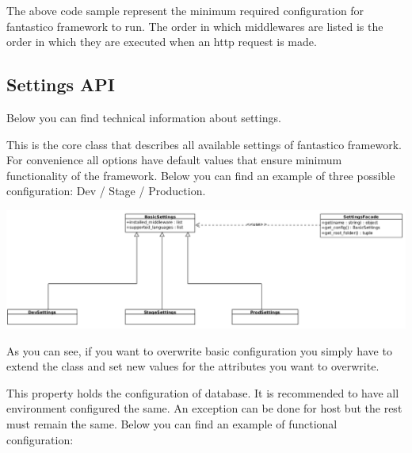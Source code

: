 \documentclass[letterpaper,10pt,english]{sphinxmanual}
\begin{document}
The above code sample represent the minimum required configuration for fantastico framework to run. The order in which middlewares
are listed is the order in which they are executed when an http request is made.


\subsection{Settings API}
\label{get_started/settings:settings-api}
Below you can find technical information about settings.

\begin{fulllineitems}
\label{get_started/settings:fantastico.settings.BasicSettings}
This is the core class that describes all available settings of fantastico framework. For convenience all options
have default values that ensure minimum functionality of the framework. Below you can find an example of three possible
configuration: Dev / Stage / Production.

\includegraphics{settings.png}

As you can see, if you want to overwrite basic configuration you simply have to extend the class and set new values
for the attributes you want to overwrite.

\begin{fulllineitems}
\label{get_started/settings:fantastico.settings.BasicSettings.database_config}
This property holds the configuration of database. It is recommended to have all environment configured the same.
An exception can be done for host but the rest must remain the same. Below you can find an example of functional
configuration:


\end{fulllineitems}
\end{fulllineitems}
\end{document}
